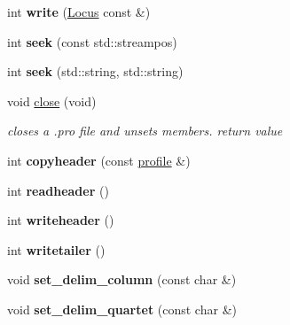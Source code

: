 \begin{DoxyCompactItemize}
\item 
\hypertarget{classprofile_aefe45dcc6563bd3aabbcf6671a377a82}{int {\bfseries write} (\hyperlink{classLocus}{Locus} const \&)}\label{classprofile_aefe45dcc6563bd3aabbcf6671a377a82}

\item 
\hypertarget{classprofile_ab58c25bc9a2b9f19c949f1eb3929443a}{int {\bfseries seek} (const std\-::streampos)}\label{classprofile_ab58c25bc9a2b9f19c949f1eb3929443a}

\item 
\hypertarget{classprofile_aac930ebe1c76a67ffbab55905136bce2}{int {\bfseries seek} (std\-::string, std\-::string)}\label{classprofile_aac930ebe1c76a67ffbab55905136bce2}

\item 
\hypertarget{classprofile_a6148476d9b8b5a5a20491450d92d0dcb}{void \hyperlink{classprofile_a6148476d9b8b5a5a20491450d92d0dcb}{close} (void)}\label{classprofile_a6148476d9b8b5a5a20491450d92d0dcb}

\begin{DoxyCompactList}\small\item\em closes a .pro file and unsets members.  return value \end{DoxyCompactList}\item 
\hypertarget{classprofile_ada1dcfd3a02b7e2e06d11fa333f23a63}{int {\bfseries copyheader} (const \hyperlink{classprofile}{profile} \&)}\label{classprofile_ada1dcfd3a02b7e2e06d11fa333f23a63}

\item 
\hypertarget{classprofile_a5b4058a8f0132b09130fbf586fddc39d}{int {\bfseries readheader} ()}\label{classprofile_a5b4058a8f0132b09130fbf586fddc39d}

\item 
\hypertarget{classprofile_a2a779c8acb71361916712139ed427c9b}{int {\bfseries writeheader} ()}\label{classprofile_a2a779c8acb71361916712139ed427c9b}

\item 
\hypertarget{classprofile_a3089bc418634f442ef71b930abc68edd}{int {\bfseries writetailer} ()}\label{classprofile_a3089bc418634f442ef71b930abc68edd}

\item 
\hypertarget{classprofile_abe49022e667f3e893dec454511e9aa3d}{void {\bfseries set\-\_\-delim\-\_\-column} (const char \&)}\label{classprofile_abe49022e667f3e893dec454511e9aa3d}

\item 
\hypertarget{classprofile_a627ca3883b151c65a50d0e5e02b40998}{void {\bfseries set\-\_\-delim\-\_\-quartet} (const char \&)}\label{classprofile_a627ca3883b151c65a50d0e5e02b40998}


\end{DoxyCompactItemize}
